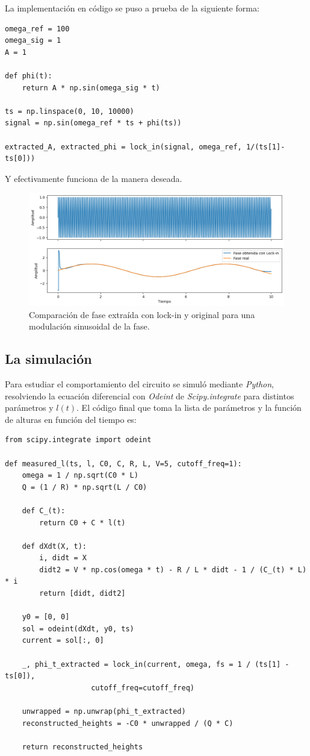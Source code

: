 La implementación en código se puso a prueba de la siguiente forma:

\begin{lstlisting}
omega_ref = 100
omega_sig = 1
A = 1
	
def phi(t):
	return A * np.sin(omega_sig * t)
	
ts = np.linspace(0, 10, 10000)
signal = np.sin(omega_ref * ts + phi(ts))
	
extracted_A, extracted_phi = lock_in(signal, omega_ref, 1/(ts[1]-ts[0]))
\end{lstlisting}

Y efectivamente funciona de la manera deseada.

\begin{figure}[!ht]
	\centering
	\includegraphics[width=0.9\linewidth]{Figures/31_03_2025/Lock_in}
	\caption{Comparación de fase extraída con lock-in y original para una modulación sinusoidal de la fase.}
	\label{fig:lockin}
\end{figure}


\subsection*{La simulación}
Para estudiar el comportamiento del circuito se simuló mediante \textit{Python}, resolviendo la ecuación diferencial con \textit{Odeint} de \textit{Scipy.integrate} para distintos parámetros y $l(t)$. El código final que toma la lista de parámetros y la función de alturas en función del tiempo es:

\begin{lstlisting}
from scipy.integrate import odeint
	
def measured_l(ts, l, C0, C, R, L, V=5, cutoff_freq=1):
	omega = 1 / np.sqrt(C0 * L)
	Q = (1 / R) * np.sqrt(L / C0)
	
	def C_(t):
		return C0 + C * l(t)
	
	def dXdt(X, t):
		i, didt = X
		didt2 = V * np.cos(omega * t) - R / L * didt - 1 / (C_(t) * L) * i
		return [didt, didt2]
	
	y0 = [0, 0]
	sol = odeint(dXdt, y0, ts)
	current = sol[:, 0]  
	
	_, phi_t_extracted = lock_in(current, omega, fs = 1 / (ts[1] - ts[0]), 
				    cutoff_freq=cutoff_freq)
	
	unwrapped = np.unwrap(phi_t_extracted)
	reconstructed_heights = -C0 * unwrapped / (Q * C)
	
	return reconstructed_heights
\end{lstlisting}

